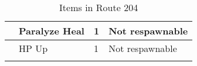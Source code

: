 \begin{longtable}{|| l l l l ||}%
\hline%
&Paralyze Heal&1&Not respawnable\\%
\hline%
&HP Up&1&Not respawnable\\%
\hline%
\endhead%
\hline%
\caption{Items in Route 204}%
\label{tab:Route204Items}%
\end{longtable}